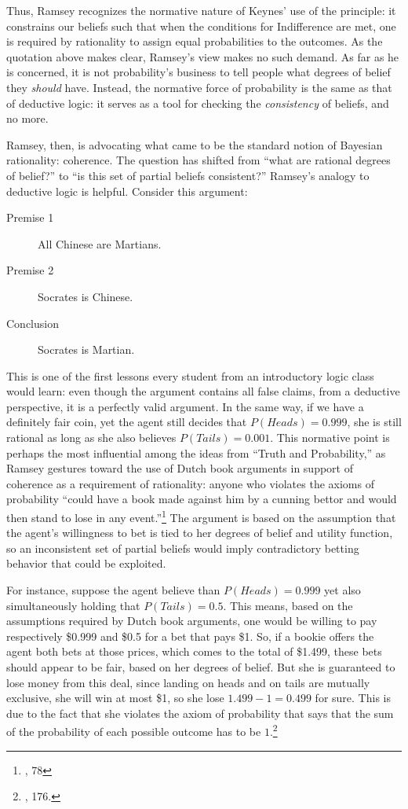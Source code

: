 Thus, Ramsey recognizes the normative nature of Keynes' use of the
principle: it constrains our beliefs such that when the conditions for
Indifference are met, one is required by rationality to assign equal probabilities to the outcomes. As the quotation above
makes clear, Ramsey's view makes no such demand. As far as he is
concerned, it is not probability's business to tell people what degrees
of belief they \emph{should} have. Instead, the normative force of
probability is the same as that of deductive logic: it serves as a tool
for checking the \emph{consistency} of  beliefs, and no more.

Ramsey, then, is advocating what came to be the standard notion of
Bayesian rationality: coherence. The question has shifted from ``what
are rational degrees of belief?'' to ``is this set of partial beliefs
consistent?'' Ramsey's analogy to deductive logic is helpful. Consider
this argument:

\begin{description}
	\item[Premise 1] All Chinese are Martians.
	\item[Premise 2]  Socrates is Chinese.
	\item[Conclusion] Socrates is Martian.
\end{description}

This is one of the first lessons every student from an introductory logic class would learn: even though the argument contains all false claims, from a deductive
perspective, it is a perfectly valid argument. In the same way, if we
have a definitely fair coin, yet the agent still decides that
\(P(Heads)=0.999\), she is still rational as long as she also believes
\(P(Tails) = 0.001\). This normative point is perhaps the most
influential among the ideas from ``Truth and Probability,'' as Ramsey
gestures toward the use of Dutch book arguments in support of coherence
as a requirement of rationality: anyone who violates the axioms of
probability ``could have a book made against him by a cunning bettor and
would then stand to lose in any event.''\footnote{\cite{ramsey}, 78} The argument
is based on the assumption that the agent's willingness to bet is tied to
her degrees of belief and utility function, so an inconsistent set of
partial beliefs would imply contradictory betting behavior that could be
exploited.

For instance, suppose the agent believe than \(P(Heads) = 0.999\) yet also
simultaneously holding that \(P(Tails) = 0.5\). This means, based on the
assumptions required by Dutch book arguments, one would be willing to
pay respectively \$0.999 and \$0.5 for a bet that pays \$1. So, if a
bookie offers the agent both bets at those prices, which comes to the
total of \$1.499, these bets should appear to be fair, based on her
degrees of belief. But she is guaranteed to lose money from this deal,
since landing on heads and on tails are mutually exclusive, she will win
at most \$1, so she lose \(1.499 - 1 = 0.499\) for sure. This is due to
the fact that she violates the axiom of probability that says that the
sum of the probability of each possible outcome has to be
\(1\).\footnote{\cite{hajekdutchbook}, 176.}

